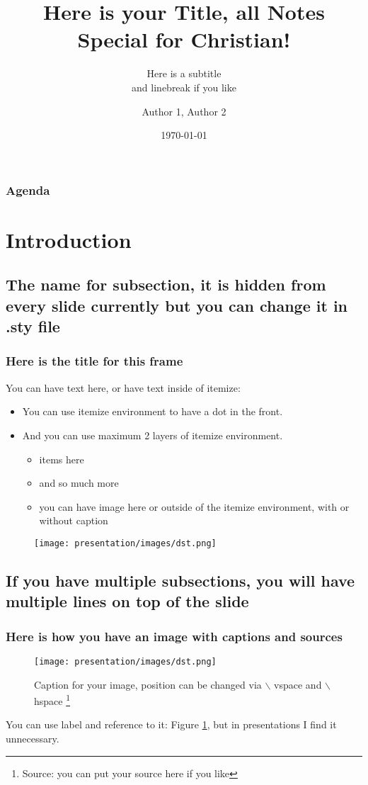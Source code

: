 \documentclass[aspectratio=169]{beamer}
\title[here is short]{Here is your Title, all Notes Special for Christian!}
\subtitle{Here is a subtitle \\ and linebreak if you like}
\author{Author 1, Author 2}
\institute{Department of Informatics\\Your Uni}
\date{\today}
\begin{document}
\begin{frame}
	\titlepage
\end{frame}

\begin{frame}
	\frametitle{Agenda}
	\tableofcontents
\end{frame}

\section{Introduction}
\subsection{The name for subsection, it is hidden from every slide currently but you can change it in .sty file}

\begin{frame}[fragile]
	\frametitle{Here is the title for this frame}
	You can have text here, or have text inside of itemize:
	\begin{itemize}
	    \item You can use itemize environment to have a dot in the front. 
	    \item And you can use maximum 2 layers of itemize environment. 
	    \begin{itemize}
	        \item items here
	        \item and so much more
	        \item you can have image here or outside of the itemize environment, with or without caption
	    \end{itemize}
	\end{itemize}
	
	\begin{figure}
        \centering
        \texttt{[image: presentation/images/dst.png]} 
    \end{figure}
\end{frame}

\subsection{If you have multiple subsections, you will have multiple lines on top of the slide}
\begin{frame}[fragile]
	\frametitle{Here is how you have an image with captions and sources}
	\begin{figure}
	    \centering
	    \texttt{[image: presentation/images/dst.png]}
	    \vspace{-3mm}\caption{Caption for your image, position can be changed via $\backslash$ vspace and $\backslash$ hspace \footnote{\tiny Source: you can put your source here if you like }}
	    \label{dst}
	\end{figure}
	You can use label and reference to it: Figure \ref{dst}, but in presentations I find it unnecessary. 
\end{frame}
\end{document}
